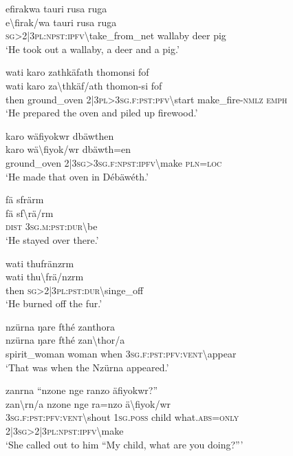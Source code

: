 \ea\label{ex:8:a1687}
efirakwa tauri rusa ruga\\
\gll e{\textbackslash}firak/wa	tauri	rusa	ruga\\
     \textsc{sg}>2|3\textsc{pl}:\textsc{npst}:\textsc{ipfv}{\textbackslash}take\_from\_net	wallaby	deer	pig\\
\glt `He took out a wallaby, a deer and a pig.'
\z

\ea\label{ex:8:a1690}
wati karo zathkäfath thomonsi fof\\
\gll wati	karo	za{\textbackslash}thkäf/ath	thomon-si	fof\\
     then	ground\_oven	2|3\textsc{pl}>3\textsc{sg}.\textsc{f}:\textsc{pst}:\textsc{pfv}{\textbackslash}start	make\_fire-\textsc{nmlz}	\textsc{emph}\\
\glt `He prepared the oven and piled up firewood.'
\z

\ea\label{ex:8:a1693}
karo wäfiyokwr dbäwthen\\
\gll karo	wä{\textbackslash}fiyok/wr	dbäwth=en\\
     ground\_oven	2|3\textsc{sg}>3\textsc{sg}.\textsc{f}:\textsc{npst}:\textsc{ipfv}{\textbackslash}make	\textsc{pln}=\textsc{loc}\\
\glt `He made that oven in Débäwéth.'
\z

\ea\label{ex:8:a1694}
fä sfrärm\\
\gll fä	sf{\textbackslash}rä/rm\\
     \textsc{dist}	3\textsc{sg}.\textsc{m}:\textsc{pst}:\textsc{dur}{\textbackslash}be\\
\glt `He stayed over there.'
\z

\ea\label{ex:8:a1695}
wati thufränzrm\\
\gll wati	thu{\textbackslash}frä/nzrm\\
     then	\textsc{sg}>2|3\textsc{pl}:\textsc{pst}:\textsc{dur}{\textbackslash}singe\_off\\
\glt `He burned off the fur.'
\z

\ea\label{ex:8:a1696}
nzürna ŋare fthé zanthora\\
\gll nzürna	ŋare	fthé	zan{\textbackslash}thor/a\\
     spirit\_woman	woman	when	3\textsc{sg}.\textsc{f}:\textsc{pst}:\textsc{pfv}:\textsc{vent}{\textbackslash}appear\\
\glt `That was when the Nzürna appeared.'
\z

\ea\label{ex:8:a1697}
zanrna ``nzone nge ranzo äfiyokwr?''\\
\gll zan{\textbackslash}rn/a	nzone	nge	ra=nzo	ä{\textbackslash}fiyok/wr\\
     3\textsc{sg}.\textsc{f}:\textsc{pst}:\textsc{pfv}:\textsc{vent}{\textbackslash}shout	1\textsc{sg}.\textsc{poss}	child	what.\textsc{abs}=\textsc{only}	2|3\textsc{sg}>2|3\textsc{pl}:\textsc{npst}:\textsc{ipfv}{\textbackslash}make\\
\glt `She called out to him ``My child, what are you doing?'''
\z

